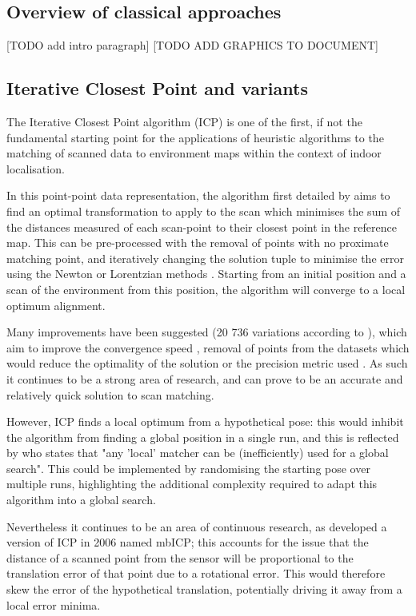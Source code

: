 \documentclass[authoryearcitations]{UoYCSproject}
\begin{document}
\subsection{Overview of classical approaches}
[TODO add intro paragraph]
[TODO ADD GRAPHICS TO DOCUMENT]
\label{sec:classical_approaches}
\subsection{Iterative Closest Point and variants}

The Iterative Closest Point algorithm (ICP) is one of the first, if not the fundamental starting point for the applications of heuristic algorithms to the matching of scanned data to environment maps within the context of indoor localisation.

In this point-point data representation, the algorithm first detailed by \citet{Besl1992-pd} aims to find an optimal transformation to apply to the scan which minimises the sum of the distances measured of each scan-point to their closest point in the reference map. This can be pre-processed with the removal of points with no proximate matching point, and iteratively changing the solution tuple to minimise the error using the Newton or Lorentzian methods \cite{Munoz2005-gt}. Starting from an initial position and a scan of the environment from this position, the algorithm will converge to a local optimum alignment. 

Many improvements have been suggested (20 736 variations according to \citet{Donoso2017-wp}), which aim to improve the convergence speed \cite{Donoso2017-wp} \cite{Simon1996-dl}, removal of points from the datasets which would reduce the optimality of the solution \cite{Weik1997-px} \cite{Masuda1996-av} or the precision metric used \cite{Eggert1997-ak}. As such it continues to be a strong area of research, and can prove to be an accurate and relatively quick solution to scan matching.

However, ICP finds a local optimum from a hypothetical pose: this would inhibit the algorithm from finding a global position in a single run, and this is reflected by \citet{Censi2005-iv} who states that "any 'local' matcher can be (inefficiently) used for a global search". This could be implemented by randomising the starting pose over multiple runs, highlighting the additional complexity required to adapt this algorithm into a global search.

Nevertheless it continues to be an area of continuous research, as \citet{Minguez2006-nj} developed a version of ICP in 2006 named mbICP;  this accounts for the issue that the distance of a scanned point from the sensor will be proportional to the translation error of that point due to a rotational error. This would therefore skew the error of the hypothetical translation, potentially driving it away from a local error minima.
\end{document}
